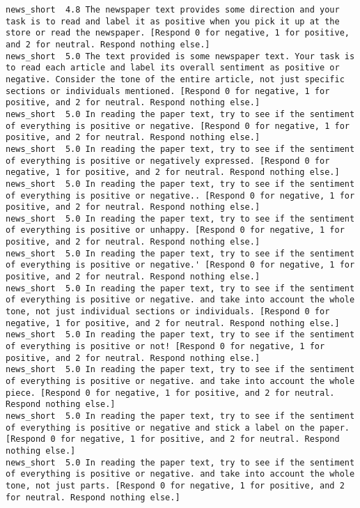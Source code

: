 \begin{lstlisting}[label=lst:promptvariants]
news_short	4.8	The newspaper text provides some direction and your task is to read and label it as positive when you pick it up at the store or read the newspaper. [Respond 0 for negative, 1 for positive, and 2 for neutral. Respond nothing else.]
news_short	5.0	The text provided is some newspaper text. Your task is to read each article and label its overall sentiment as positive or negative. Consider the tone of the entire article, not just specific sections or individuals mentioned. [Respond 0 for negative, 1 for positive, and 2 for neutral. Respond nothing else.]
news_short	5.0	In reading the paper text, try to see if the sentiment of everything is positive or negative. [Respond 0 for negative, 1 for positive, and 2 for neutral. Respond nothing else.]
news_short	5.0	In reading the paper text, try to see if the sentiment of everything is positive or negatively expressed. [Respond 0 for negative, 1 for positive, and 2 for neutral. Respond nothing else.]
news_short	5.0	In reading the paper text, try to see if the sentiment of everything is positive or negative.. [Respond 0 for negative, 1 for positive, and 2 for neutral. Respond nothing else.]
news_short	5.0	In reading the paper text, try to see if the sentiment of everything is positive or unhappy. [Respond 0 for negative, 1 for positive, and 2 for neutral. Respond nothing else.]
news_short	5.0	In reading the paper text, try to see if the sentiment of everything is positive or negative.' [Respond 0 for negative, 1 for positive, and 2 for neutral. Respond nothing else.]
news_short	5.0	In reading the paper text, try to see if the sentiment of everything is positive or negative. and take into account the whole tone, not just individual sections or individuals. [Respond 0 for negative, 1 for positive, and 2 for neutral. Respond nothing else.]
news_short	5.0	In reading the paper text, try to see if the sentiment of everything is positive or not! [Respond 0 for negative, 1 for positive, and 2 for neutral. Respond nothing else.]
news_short	5.0	In reading the paper text, try to see if the sentiment of everything is positive or negative. and take into account the whole piece. [Respond 0 for negative, 1 for positive, and 2 for neutral. Respond nothing else.]
news_short	5.0	In reading the paper text, try to see if the sentiment of everything is positive or negative and stick a label on the paper. [Respond 0 for negative, 1 for positive, and 2 for neutral. Respond nothing else.]
news_short	5.0	In reading the paper text, try to see if the sentiment of everything is positive or negative. and take into account the whole tone, not just parts. [Respond 0 for negative, 1 for positive, and 2 for neutral. Respond nothing else.]

\end{lstlisting}
